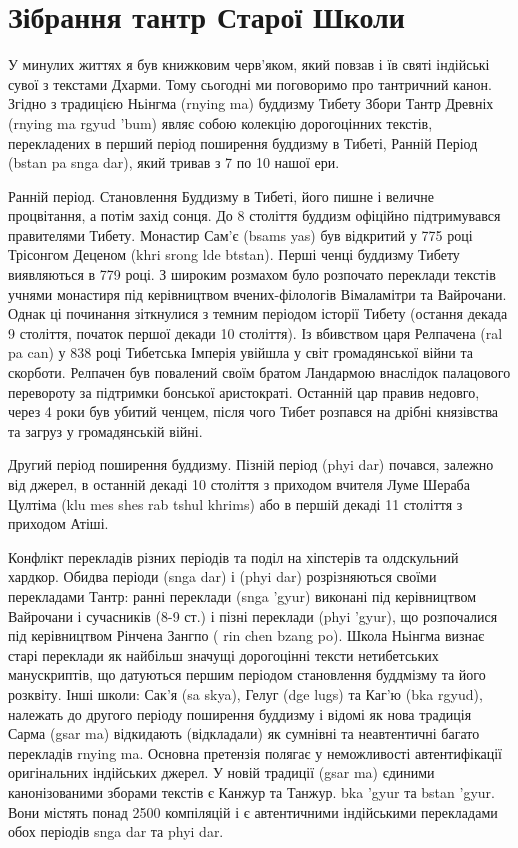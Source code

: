 \section{Зібрання тантр Старої Школи}
 
У минулих життях я був книжковим черв'яком, який повзав
і їв святі індійські сувої з текстами Дхарми. Тому сьогодні
ми поговоримо про тантричний канон. Згідно з традицією
Ньінгма (rnying ma) буддизму Тибету Збори Тантр
Древніх (rnying ma rgyud 'bum) являє собою колекцію
дорогоцінних текстів, перекладених в перший період поширення
буддизму в Тибеті, Ранній Період (bstan pa snga dar),
який тривав з 7 по 10 нашої ери.

Ранній період. Становлення Буддизму в Тибеті, його пишне
і величне процвітання, а потім захід сонця. До 8 століття
буддизм офіційно підтримувався правителями Тибету. Монастир
Сам'є (bsams yas) був відкритий у 775 році Трісонгом
Деценом (khri srong lde btstan). Перші ченці буддизму
Тибету виявляються в 779 році. З широким розмахом було
розпочато переклади текстів учнями монастиря під керівництвом
вчених-філологів Вімаламітри та Вайрочани. Однак ці починання
зіткнулися з темним періодом історії Тибету (остання декада
9 століття, початок першої декади 10 століття). Із вбивством
царя Релпачена (ral pa can) у 838 році Тибетська Імперія
увійшла у світ громадянської війни та скорботи. Релпачен
був повалений своїм братом Ландармою внаслідок палацового
перевороту за підтримки бонської аристократі. Останній
цар правив недовго, через 4 роки був убитий ченцем, після
чого Тибет розпався на дрібні князівства та загруз у громадянській війні.

Другий період поширення буддизму. Пізній період (phyi dar) почався,
залежно від джерел, в останній декаді 10 століття з приходом
вчителя Луме Шераба Цултіма (klu mes shes rab tshul khrims) або
в першій декаді 11 століття з приходом Атіші.

Конфлікт перекладів різних періодів та поділ на хіпстерів та олдскульний хардкор.
Обидва періоди (snga dar) і (phyi dar) розрізняються своїми перекладами
Тантр: ранні переклади (snga 'gyur) виконані під керівництвом Вайрочани
і сучасників (8-9 ст.) і пізні переклади (phyi 'gyur), що розпочалися
під керівництвом Рінчена Зангпо ( rin chen bzang po). Школа Ньінгма
визнає старі переклади як найбільш значущі дорогоцінні тексти нетибетських
манускриптів, що датуються першим періодом становлення буддмізму та його
розквіту. Інші школи: Сак'я (sa skya), Гелуг (dge lugs) та Каг'ю (bka rgyud),
належать до другого періоду поширення буддизму і відомі як нова традиція
Сарма (gsar ma) відкидають (відкладали) як сумнівні та неавтентичні багато
перекладів rnying ma. Основна претензія полягає у неможливості
автентифікації оригінальних індійських джерел. У новій традиції (gsar ma)
єдиними канонізованими зборами текстів є Канжур та Танжур. bka 'gyur та bstan 'gyur.
Вони містять понад 2500 компіляцій і є автентичними індійськими
перекладами обох періодів snga dar та phyi dar.

